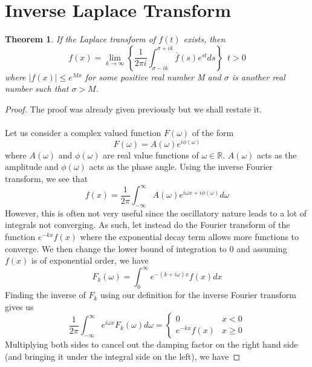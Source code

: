 \documentclass{report}
\newtheorem{theorem}{Theorem}[chapter]
\theoremstyle{definition}
\theoremstyle{remark}
\newcommand{\R}{\mathbb{R}}
\begin{document}
\section{Inverse Laplace Transform}
\begin{theorem}
    If the Laplace transform of $f(t)$ exists, then 
    \begin{equation*}
        f(x) = \lim_{k\rightarrow \infty} \left\{ \frac{1}{2\pi i}\int^{\sigma+ik}_{\sigma-ik} \bar{f}(s)e^{st} ds\right\} \,\,\, t>0
    \end{equation*}
    where $|f(x)| \leq e^{Mx}$ for some positive real number M and $\sigma$ is another real number such that $\sigma > M$.
\end{theorem}
\begin{proof}
    The proof was already given previously but we shall restate it. \\\\Let us consider a complex valued function $F(\omega)$ of the form 
\begin{equation*}
    F(\omega) = A(\omega)e^{i\phi(\omega)}
\end{equation*}
where $A(\omega)$ and $\phi(\omega)$ are real value functions of $\omega \in \R$. $A(\omega)$ acts as the amplitude and $\phi(\omega)$ acts as the phase angle. Using the inverse Fourier transform, we see that 
\begin{equation*}
    f(x)=\frac{1}{2\pi}\int^\infty_{-\infty}A(\omega)e^{i\omega x+i\phi(\omega)}d\omega
\end{equation*}
However, this is often not very useful since the oscillatory nature leads to a lot of integrals not converging. As such, let instead do the Fourier transform of the function $e^{-kx}f(x)$ where the exponential decay term allows more functions to converge. We then change the lower bound of integration to 0 and assuming $f(x)$ is of exponential order, we have 
\begin{equation*}
    F_k(\omega) = \int^\infty_0e^{-(k+i\omega)x}f(x)dx
\end{equation*}
Finding the inverse of $F_k$ using our definition for the inverse Fourier transform gives us 
\begin{equation*}
    \frac{1}{2\pi}\int^\infty_{-\infty}e^{i\omega x}F_k(\omega)d \omega = \begin{cases}
        0 &x<0 \\e^{-kx}f(x)&x\geq 0
    \end{cases}
\end{equation*}
Multiplying both sides to cancel out the damping factor on the right hand side (and bringing it under the integral side on the left), we have 

\end{proof}
\end{document}
